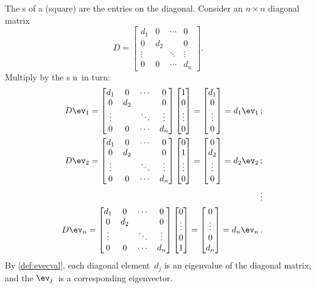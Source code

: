 \begin{example} \label{eg:eigndiag}
The s of a (square)  are the entries on the diagonal.
Consider an \(n\times n\) diagonal matrix
\def\dd{\begin{bmatrix} d_1&0&\cdots&0
\\0&d_2&&0
\\\vdots&&\ddots&\vdots
\\0&0&\cdots&d_n \end{bmatrix}}
\begin{equation*}
D=\dd.
\end{equation*}
Multiply by the s \hlist\ev n\ in turn:
\begin{eqnarray*}
&&D\ev_1
=\dd
\begin{bmatrix} 1\\0\\\vdots\\0 \end{bmatrix}
=\begin{bmatrix} d_1\\0\\\vdots\\0 \end{bmatrix}
=d_1\ev_1\,;
\\&&D\ev_2
=\dd
\begin{bmatrix} 0\\1\\\vdots\\0 \end{bmatrix}
=\begin{bmatrix} 0\\d_2\\\vdots\\0 \end{bmatrix}
=d_2\ev_2\,;
\\&&\vdots
\\&&D\ev_n
=\dd
\begin{bmatrix} 0\\\vdots\\0\\1 \end{bmatrix}
=\begin{bmatrix} 0\\\vdots\\0\\d_n \end{bmatrix}
=d_n\ev_n\,.
\end{eqnarray*}
By \cref{def:evecval}, each diagonal element~\(d_j\)  is an eigenvalue of the diagonal matrix, and the  \(\ev_j\)~is a corresponding eigenvector.
\end{example}


